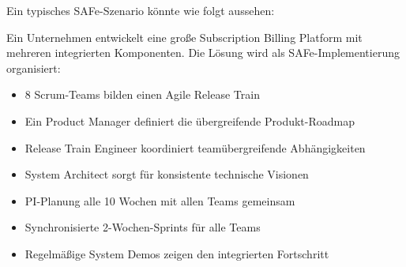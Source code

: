 \begin{example}
    Ein typisches SAFe-Szenario könnte wie folgt aussehen:
    
    Ein Unternehmen entwickelt eine große Subscription Billing Platform mit mehreren integrierten Komponenten. Die Lösung wird als SAFe-Implementierung organisiert:
    
    \begin{itemize}
        \item 8 Scrum-Teams bilden einen Agile Release Train
        \item Ein Product Manager definiert die übergreifende Produkt-Roadmap
        \item Release Train Engineer koordiniert teamübergreifende Abhängigkeiten
        \item System Architect sorgt für konsistente technische Visionen
        \item PI-Planung alle 10 Wochen mit allen Teams gemeinsam
        \item Synchronisierte 2-Wochen-Sprints für alle Teams
        \item Regelmäßige System Demos zeigen den integrierten Fortschritt
    \end{itemize}
\end{example}